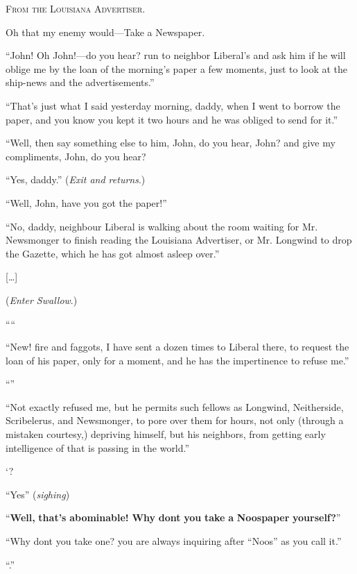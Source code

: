 \begin{ipquote}
\begin{center}
\textsc{From the Louisiana Advertiser.}
\end{center}
Oh that my enemy would—Take a Newspaper.

“John! Oh John!—do you hear? run to neighbor Liberal’s and ask him if he will oblige me by the loan of the morning’s paper a few moments, just to look at the ship-news and the advertisements.”

“That’s just what I said yesterday morning, daddy, when I went to borrow the paper, and you know you kept it two hours and he was obliged to send for it.”

“Well, then say something else to him, John, do you hear, John? and give my compliments, John, do you hear?

“Yes, daddy.” (\textit{Exit and returns}.)

“Well, John, have you got the paper!”

{“No, daddy, neighbour Liberal is walking about the room waiting for Mr. Newsmonger to finish reading the Louisiana Advertiser, or Mr. Longwind to drop the Gazette, which he has got almost asleep over.”

\centering
{[…]}

(\textit{Enter Swallow}.)}

““

“New! fire and faggots, I have sent a dozen times to Liberal there, to request the loan of his paper, only for a moment, and he has the impertinence to refuse me.”

“”

“Not exactly refused me, but he permits such fellows as Longwind, Neitherside, Scribelerus, and Newsmonger, to pore over them for hours, not only (through a mistaken courtesy,) depriving himself, but his neighbors, from getting early intelligence of that is passing in the world.”

‘?

“Yes” (\textit{sighing})

“\textbf{Well,} \textbf{that’s} \textbf{abominable!} \textbf{Why} \textbf{dont} \textbf{you} \textbf{take} \textbf{a} \textbf{Noospaper} \textbf{yourself?}”

“Why dont you take one? you are always inquiring after “Noos” as you call it.”

“.”


\end{ipquote}
